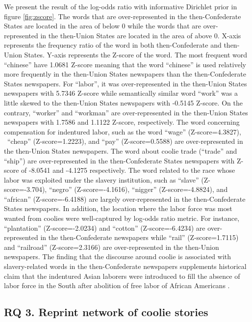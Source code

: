 \documentclass[11pt]{article}
\begin{document}
We present the result of the log-odds ratio with informative Dirichlet prior in figure \ref{fig:zscore}.
The words that are over-represented in the then-Confederate States are located in the area of below 0 while 
the words that are over-represented in the then-Union States are located in the area of above 0. X-axis represents
the frequency ratio of the word in both then-Confederate and then-Union States. Y-axis represents the Z-score of the word.
The most frequent word ``chinese'' have 1.0681 Z-score meaning that the word ``chinese'' is used relatively
more frequently in the then-Union States newspapers than the then-Confederate States newspapers.
For ``labor'', it was over-represented in the then-Union States newspapers with 5.7346 Z-score while
semantically similar word ``work'' was a little skewed to the then-Union States newspapers with -0.5145 Z-score. 
On the contrary, ``worker'' and ``workman'' are over-represented in the then-Union States newspapers with
1.7586 and 1.1122 Z-score, respectively.
The word concerning compensation for indentured labor, such as the word ``wage'' (Z-score=4.3827), \
``cheap'' (Z-score=1.2223), and ``pay'' (Z-score=0.5588) are over-represented in the then-Union States newspapers.
The word about coolie trade (``trade'' and ``ship'') are over-represented in the then-Confederate States newspapers with
Z-score of -8.0541 and -4.1275 respectively.
The word related to the race whose labor was exploited under the slavery institution, such as 
``slave'' (Z-score=-3.704), ``negro'' (Z-score=-4.1616), ``nigger'' (Z-score=-4.8824), and ``african'' (Z-score=-6.4188) are largely over-represented 
in the then-Confederate States newspapers. In addition, the location where the labor force was most wanted from coolies
were well-captured by log-odds ratio metric. For instance, ``plantation'' (Z-score=-2.0234) and 
``cotton'' (Z-score=-6.4234) are over-represented
in the then-Confederate newspapers while ``rail'' (Z-score=1.7115) and ``railroad'' (Z-score=2.3166) are over-represented in the then-Union newspapers.
The finding that the discourse around coolie is associated with slavery-related words in the then-Confederate newspapers 
supplements historical claim that the indentured Asian laborers were introduced to fill the absence of labor force in the South after abolition
of free labor of African Americans \cite{van2016coolie}.

\subsection{RQ 3. Reprint network of coolie stories} \label{sec:result_rq3_reprint}
\end{document}
